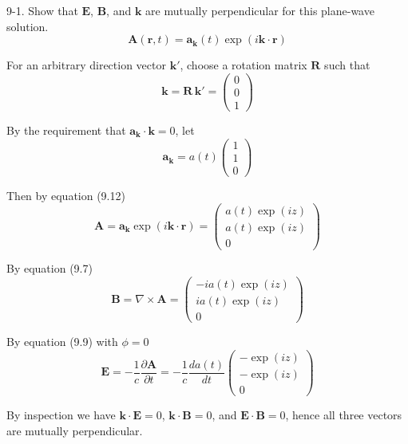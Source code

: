 \documentclass[12pt]{article}
\begin{document}
9-1.
Show that $\mathbf E$, $\mathbf B$, and $\mathbf k$ are
mutually perpendicular for this plane-wave solution.
\begin{equation*}
\mathbf A(\mathbf r,t)=\mathbf a_{\mathbf k}(t)
\exp(i\mathbf k\cdot\mathbf r)
\tag{9.12}
\end{equation*}

For an arbitrary direction vector $\mathbf k'$,
choose a rotation matrix $\mathbf R$ such that
\begin{equation*}
\mathbf k=\mathbf R\,\mathbf k'=\begin{pmatrix}0\\0\\1\end{pmatrix}
\end{equation*}

By the requirement that $\mathbf a_{\mathbf k}\cdot\mathbf k=0$, let
\begin{equation*}
\mathbf a_{\mathbf k}=a(t)\begin{pmatrix}1\\1\\0\end{pmatrix}
\end{equation*}

Then by equation (9.12)
\begin{equation*}
\mathbf A=\mathbf a_{\mathbf k}\exp(i\mathbf k\cdot\mathbf r)
=\begin{pmatrix}
a(t)\exp(iz)
\\[1ex]
a(t)\exp(iz)
\\[1ex]
0
\end{pmatrix}
\end{equation*}

By equation (9.7)
\begin{equation*}
\mathbf B=\nabla\times\mathbf A=
\begin{pmatrix}
-ia(t)\exp(iz)
\\[1ex]
ia(t)\exp(iz)
\\[1ex]
0
\end{pmatrix}
\end{equation*}

By equation (9.9) with $\phi=0$
\begin{equation*}
\mathbf E=-\frac{1}{c}\frac{\partial\mathbf A}{\partial t}=
-\frac{1}{c}\frac{da(t)}{dt}
\begin{pmatrix}
-\exp(iz)
\\[1ex]
-\exp(iz)
\\[1ex]
0
\end{pmatrix}
\end{equation*}

By inspection we have $\mathbf k\cdot\mathbf E=0$, $\mathbf k\cdot\mathbf B=0$,
and $\mathbf E\cdot\mathbf B=0$, hence all three vectors are mutually perpendicular.
\end{document}

